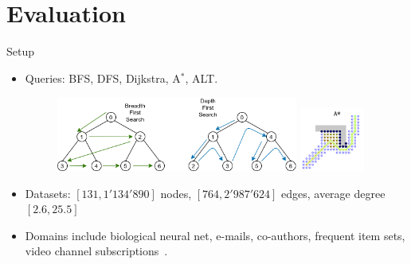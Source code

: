 \documentclass[rgb]{beamer}
\begin{document}
    \section{Evaluation}
        \begin{frame}[allowframebreaks]{Setup}
            \begin{itemize}
            \item Queries: BFS, DFS, Dijkstra, A$^*$, ALT. \\ [3em]       
                \begin{figure}
                    \begin{center}
                    \includegraphics[keepaspectratio, height=0.4\textheight, width=0.75\textwidth]{img/bfs-dfs.png} \hspace{0.7cm}
                    \includegraphics[keepaspectratio, height=0.4\textheight, width=0.2\textwidth]{img/astar.png}
                    \end{center}
                \end{figure}
                
                \framebreak
            \item Datasets: $[131, 1'134'890]$ nodes, $[764, 2'987'624]$ edges, average degree $[2.6, 25.5]$ \\ [3em]
            \item Domains include biological neural net, e-mails, co-authors, frequent item sets, video channel subscriptions~\autocite{snap}.
            \end{itemize}
        \framebreak
        

\end{frame}
\end{document}
